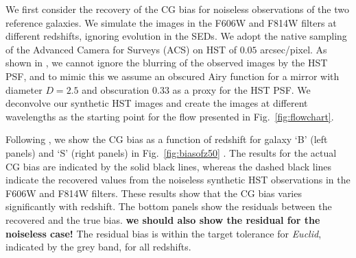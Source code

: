 \documentclass[useAMS,usenatbib]{mnras}
\begin{document}
We first consider the recovery of the CG bias for noiseless observations
of the two reference galaxies. We simulate the images in the F606W and
F814W filters at different redshifts, ignoring evolution in the SEDs. We
adopt the native sampling of the Advanced Camera for Surveys (ACS)
on HST of  $0.05$ arcsec/pixel. As shown in ,
we cannot ignore the blurring of the observed images by the HST PSF,
and to mimic this we assume an obscured Airy function for a mirror 
with diameter $D=2.5$ and obscuration  $0.33$ as a proxy for the HST PSF.
We deconvolve our synthetic HST images and create the images at different
wavelengths as the starting point for the flow presented in Fig.~\ref{fig:flowchart}.

Following , we show the CG bias as a function of redshift
for galaxy `B' (left panels) and `S' (right panels) in Fig.~\ref{fig:biasofz50} . The results for the actual
CG bias are indicated by the solid black lines, whereas the dashed black
lines indicate the recovered values from the noiseless synthetic HST observations
in the F606W and F814W filters. These results show that the CG bias varies
significantly with redshift. The bottom panels show the residuals between the
recovered and the true bias. {\bf we should also show the residual for the noiseless case!}
The residual bias is within the target tolerance for {\it Euclid}, indicated by the grey
band, for all redshifts.
\end{document}
